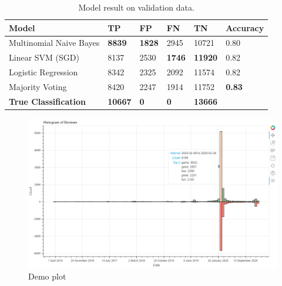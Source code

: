 \begin{table}[]
    \centering
    \caption{Model result on validation data.}
    \label{tab:validation-table}
    \begin{tabular}{@{}llllll@{}}
    \toprule
    Model                        & TP             & FP            & FN            & TN             & Accuracy      \\ \midrule
    Multinomial Naive Bayes      & \textbf{8839}  & \textbf{1828} & 2945          & 10721          & 0.80          \\
    Linear SVM (SGD)             & 8137           & 2530          & \textbf{1746} & \textbf{11920} & 0.82          \\
    Logistic Regression          & 8342           & 2325          & 2092          & 11574          & 0.82          \\
    Majority Voting              & 8420           & 2247          & 1914          & 11752          & \textbf{0.83} \\ \midrule
    \textbf{True Classification} & \textbf{10667} & \textbf{0}    & \textbf{0}    & \textbf{13666} &              
    \end{tabular}
\end{table}



\begin{figure}[h]
    \caption{Demo plot}
    \centering
    \includegraphics[width=1\textwidth]{../plots/demo.png}
\end{figure}